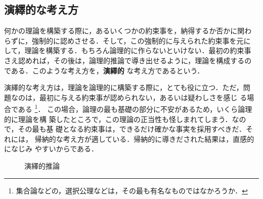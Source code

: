         \subsection{演繹的な考え方}
        何かの理論を構築する際に，あるいくつかの約束事を，納得するか否かに関わ
        らずに，強制的に認めさせる．そして，この強制的に与えられた約束事を元に
        して，理論を構築する．もちろん論理的に作らないといけない．最初の約束事
        さえ認めれば，その後は，論理的推論で導き出せるように，理論を構成するの
        である．このような考え方を，\textbf{演繹的} な考え方であるという．

        演繹的な考え方は，理論を論理的に構築する際に，とても役に立つ．ただ，問
        題なのは，最初に与える約束事が認められない，あるいは疑わしさを感じ
        る場合である
            \footnote{
                集合論などの，選択公理などは，その最も有名なものではなかろうか．
            }．
        この場合，論理の最も基礎の部分に不安があるため，いくら論理的に理論を構
        築したところで，この理論の正当性も怪しまれてしまう．なので，その最も基
        礎となる約束事は，できるだけ確かな事実を採用すべきだ．それには，
        帰納的な考え方が適している．帰納的に導きだされた結果は，直感的になじみ
        やすいからである．
            \begin{figure}[hbt]
                \begin{center}
                    \caption{演繹的推論}
                    \label{fig:EnnekiTekiSuironn}
                \end{center}
            \end{figure}


